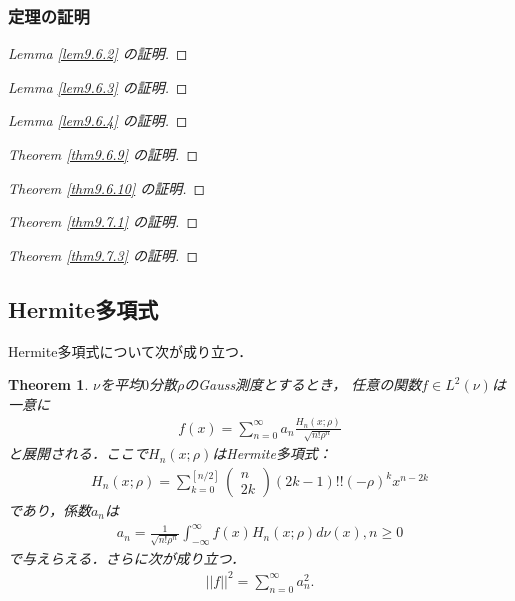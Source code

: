 \documentclass[a4paper,10pt]{jsarticle}
\theoremstyle{plain}
\newtheorem{theorem}{Theorem}
\newcommand{\eq}[1]{\begin{align}#1\end{align}}
\begin{document}
\subsubsection{定理の証明}
\begin{proof}[Lemma \ref{lem9.6.2} の証明]
\end{proof}
\begin{proof}[Lemma \ref{lem9.6.3} の証明]
\end{proof}
\begin{proof}[Lemma \ref{lem9.6.4} の証明]
\end{proof}
\begin{proof}[Theorem \ref{thm9.6.9} の証明]
\end{proof}
\begin{proof}[Theorem \ref{thm9.6.10} の証明]
\end{proof}
\begin{proof}[Theorem \ref{thm9.7.1} の証明]
\end{proof}
\begin{proof}[Theorem \ref{thm9.7.3} の証明]
\end{proof}
\subsection{Hermite多項式}
Hermite多項式について次が成り立つ．
\begin{theorem}
$\nu$を平均$0$分散$\rho$のGauss測度とするとき，
任意の関数$f\in L^2(\nu)$は一意に
\eq{f(x)=\sum_{n=0}^\infty a_n\frac{H_n(x;\rho)}{\sqrt{n!\rho^n}}}
と展開される．ここで$H_n(x;\rho)$はHermite多項式：
\eq{H_n(x;\rho)=\sum_{k=0}^{[n/2]}\left(\begin{matrix}n\\2k\end{matrix}\right)(2k-1)!!(-\rho)^kx^{n-2k}}
であり，係数$a_n$は
\eq{a_n=\frac{1}{\sqrt{n!\rho^n}}\int_{-\infty}^\infty f(x)H_n(x;\rho)d\nu(x), n\ge 0}
で与えらえる．さらに次が成り立つ．
\eq{||f||^2=\sum_{n=0}^\infty a_n^2.}
\end{theorem}
\end{document}
